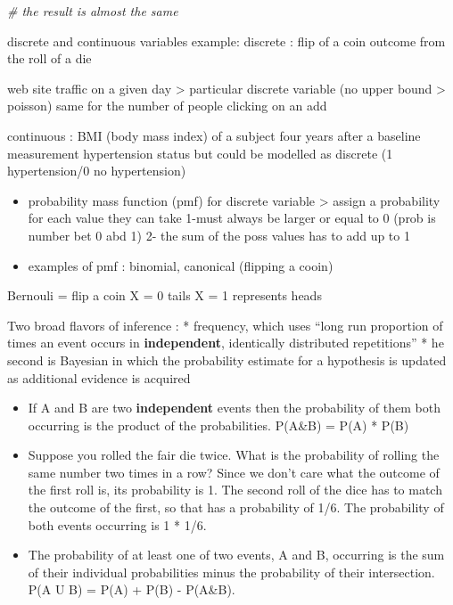\documentclass[
]{book}
\newenvironment{Shaded}{\begin{snugshade}}{\end{snugshade}}
\newcommand{\CommentTok}[1]{\textcolor[rgb]{0.56,0.35,0.01}{\textit{#1}}}
\begin{document}
\begin{Shaded}
\begin{Highlighting}[]
\CommentTok{\# the result is almost the same}
\end{Highlighting}
\end{Shaded}

discrete and continuous variables
example:
discrete : flip of a coin
outcome from the roll of a die

web site traffic on a given day \textgreater{} particular discrete variable (no upper bound \textgreater{} poisson)
same for the number of people clicking on an add

continuous :
BMI (body mass index) of a subject four years after a baseline measurement
hypertension status but could be modelled as discrete (1 hypertension/0 no hypertension)

\begin{itemize}
\item
  probability mass function (pmf)
  for discrete variable \textgreater{} assign a probability for each value they can take
  1-must always be larger or equal to 0
  (prob is number bet 0 abd 1)
  2- the sum of the poss values has to add up to 1
\item
  examples of pmf :
  binomial, canonical (flipping a cooin)
\end{itemize}

Bernouli = flip a coin
X = 0 tails
X = 1 represents heads

Two broad flavors of inference :
* frequency, which uses ``long run proportion of times an event occurs in \textbf{independent}, identically distributed repetitions''
* he second is Bayesian in which the probability estimate for a hypothesis is updated as additional evidence is acquired

\begin{itemize}
\item
  If A and B are two \textbf{independent} events then the probability of them both occurring is the product of the probabilities. P(A\&B) = P(A) * P(B)
\item
  Suppose you rolled the fair die twice. What is the probability of rolling the same number two times in a row? Since we don't care what the outcome of the first roll is, its probability is 1. The second roll of the dice has to match the outcome of the first, so that has a probability of 1/6. The probability of both events occurring is 1 * 1/6.
\item
  The probability of at least one of two events, A and B, occurring is the sum of their individual
  probabilities minus the probability of their intersection. P(A U B) = P(A) + P(B) - P(A\&B).
\end{itemize}
\end{document}
